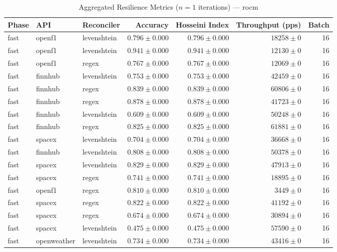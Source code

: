 
\begin{table}[htbp]
\caption{Aggregated Resilience Metrics ($n=1$ iterations) --- rocm}
\begin{tabular}{l l l r r r r}
\hline
Phase & API & Reconciler & Accuracy & Hosseini Index & Throughput (pps) & Batch \\
\hline
fast & openf1 & levenshtein & $0.796\pm0.000$ & $0.796\pm0.000$ & $18258\pm0$ & 16 \\
fast & openf1 & levenshtein & $0.941\pm0.000$ & $0.941\pm0.000$ & $12130\pm0$ & 16 \\
fast & openf1 & regex & $0.767\pm0.000$ & $0.767\pm0.000$ & $12069\pm0$ & 16 \\
fast & finnhub & levenshtein & $0.753\pm0.000$ & $0.753\pm0.000$ & $42459\pm0$ & 16 \\
fast & finnhub & regex & $0.839\pm0.000$ & $0.839\pm0.000$ & $60806\pm0$ & 16 \\
fast & finnhub & regex & $0.878\pm0.000$ & $0.878\pm0.000$ & $41723\pm0$ & 16 \\
fast & finnhub & levenshtein & $0.609\pm0.000$ & $0.609\pm0.000$ & $50248\pm0$ & 16 \\
fast & finnhub & regex & $0.825\pm0.000$ & $0.825\pm0.000$ & $61881\pm0$ & 16 \\
fast & spacex & levenshtein & $0.704\pm0.000$ & $0.704\pm0.000$ & $36668\pm0$ & 16 \\
fast & finnhub & levenshtein & $0.808\pm0.000$ & $0.808\pm0.000$ & $50378\pm0$ & 16 \\
fast & spacex & levenshtein & $0.829\pm0.000$ & $0.829\pm0.000$ & $47913\pm0$ & 16 \\
fast & spacex & regex & $0.741\pm0.000$ & $0.741\pm0.000$ & $18895\pm0$ & 16 \\
fast & openf1 & regex & $0.810\pm0.000$ & $0.810\pm0.000$ & $3449\pm0$ & 16 \\
fast & spacex & regex & $0.822\pm0.000$ & $0.822\pm0.000$ & $41192\pm0$ & 16 \\
fast & spacex & regex & $0.674\pm0.000$ & $0.674\pm0.000$ & $30894\pm0$ & 16 \\
fast & spacex & levenshtein & $0.475\pm0.000$ & $0.475\pm0.000$ & $57590\pm0$ & 16 \\
fast & openweather & levenshtein & $0.734\pm0.000$ & $0.734\pm0.000$ & $43416\pm0$ & 16 \\

\end{tabular}
\end{table}
